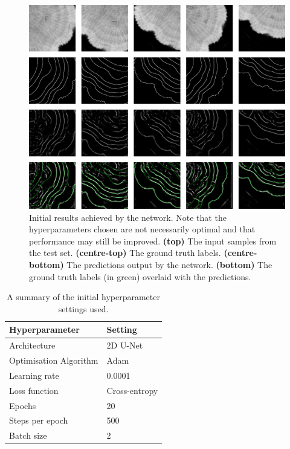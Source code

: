 \begin{figure}[t]
    \centering
    \includegraphics[width=1\textwidth]{images/initial-results.png}
    \caption{Initial results achieved by the network. Note that the hyperparameters chosen are not necessarily optimal and that performance may still be improved. \textbf{(top)} The input samples from the test set. \textbf{(centre-top)} The ground truth labels. \textbf{(centre-bottom)} The predictions output by the network. \textbf{(bottom)} The ground truth labels (in green) overlaid with the predictions.}
    \label{fig:outputs}
\end{figure}

\begin{table}[t]
    \centering
    \caption{A summary of the initial hyperparameter settings used.}
    \begin{tabular}{@{}ll@{}}
    \toprule
    Hyperparameter   & Setting      \\ \midrule
    Architecture     & 2D U-Net   \\
    Optimisation Algorithm & Adam \\
    Learning rate & 0.0001 \\
    Loss function & Cross-entropy \\
    Epochs & 20 \\
    Steps per epoch & 500 \\
    Batch size & 2 \\ \bottomrule
    \end{tabular}
    \label{tab:initialhyperparams}
\end{table}

